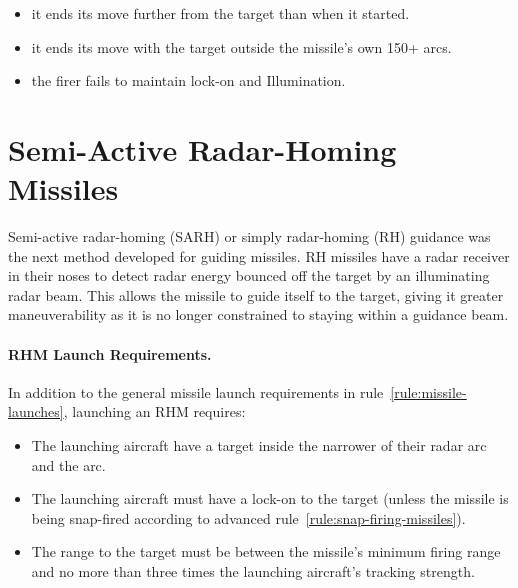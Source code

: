 {\begin{itemize}
    \item it ends its move further from the target than when it started.

    \item it ends its move with the target outside the missile's own 150+ arcs.

    \item the firer fails to maintain lock-on and Illumination.

\end{itemize}

}{

\section{Semi-Active Radar-Homing Missiles}
\label{rule:semi-active-radar-homing-missiles}

Semi-active radar-homing (SARH) or simply radar-homing (RH) guidance was the next method developed for guiding missiles. RH missiles have a radar receiver in their noses to detect radar energy bounced off the target by an illuminating radar beam. This allows the missile to guide itself to the target, giving it greater maneuverability as it is no longer constrained to staying within a guidance beam.

\paragraph{RHM Launch Requirements.}
\label{rule:rhm-launch-requirements} 

In addition to the general missile launch requirements in rule~\ref{rule:missile-launches}, launching an RHM requires:

\begin{itemize}

    \item The launching aircraft have a target inside the narrower of their radar arc and the  arc.

    \item The launching aircraft must have a lock-on to the target (unless the missile is being snap-fired according to advanced rule~\ref{rule:snap-firing-missiles}).

    \item The range to the target must be between the missile's minimum firing range and no more than three times the launching aircraft's tracking strength.

\end{itemize}

}
